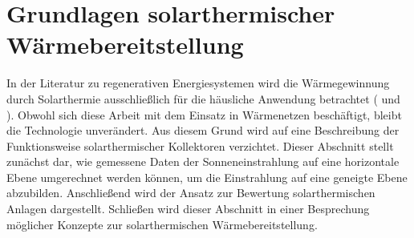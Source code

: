 \chapter{Grundlagen solarthermischer Wärmebereitstellung}\label{section: Solarthermische Wärmebereitstellung}
\thispagestyle{empty}

In der Literatur zu regenerativen Energiesystemen wird die Wärmegewinnung durch Solarthermie ausschließlich für die häusliche Anwendung betrachtet (\citet{Quaschning2015} und \citet{Watter2013}). Obwohl sich diese Arbeit mit dem Einsatz in Wärmenetzen  beschäftigt, bleibt die Technologie unverändert. Aus diesem Grund wird auf eine Beschreibung der Funktionsweise solarthermischer Kollektoren verzichtet. Dieser Abschnitt stellt zunächst dar, wie gemessene Daten der Sonneneinstrahlung auf eine horizontale Ebene umgerechnet werden können, um die Einstrahlung auf eine geneigte Ebene abzubilden. Anschließend wird der Ansatz zur Bewertung solarthermischen Anlagen dargestellt. Schließen wird dieser Abschnitt in einer Besprechung möglicher Konzepte zur solarthermischen Wärmebereitstellung.

